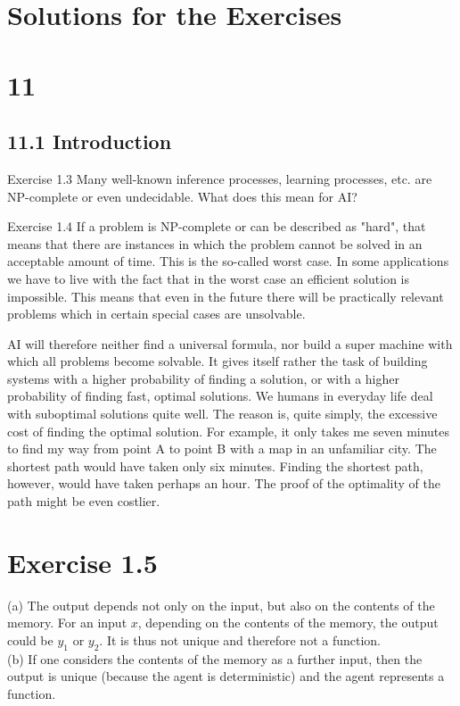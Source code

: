 \documentclass[10pt]{article}
\begin{document}
\section*{Solutions for the Exercises}
\section*{11}
\subsection*{11.1 Introduction}
Exercise 1.3 Many well-known inference processes, learning processes, etc. are NP-complete or even undecidable. What does this mean for AI?


Exercise 1.4 If a problem is NP-complete or can be described as "hard", that means that there are instances in which the problem cannot be solved in an acceptable amount of time. This is the so-called worst case. In some applications we have to live with the fact that in the worst case an efficient solution is impossible. This means that even in the future there will be practically relevant problems which in certain special cases are unsolvable.

AI will therefore neither find a universal formula, nor build a super machine with which all problems become solvable. It gives itself rather the task of building systems with a higher probability of finding a solution, or with a higher probability of finding fast, optimal solutions. We humans in everyday life deal with suboptimal solutions quite well. The reason is, quite simply, the excessive cost of finding the optimal solution. For example, it only takes me seven minutes to find my way from point A to point B with a map in an unfamiliar city. The shortest path would have taken only six minutes. Finding the shortest path, however, would have taken perhaps an hour. The proof of the optimality of the path might be even costlier.

\section*{Exercise 1.5}
(a) The output depends not only on the input, but also on the contents of the memory. For an input $x$, depending on the contents of the memory, the output could be $y_{1}$ or $y_{2}$. It is thus not unique and therefore not a function.\\
(b) If one considers the contents of the memory as a further input, then the output is unique (because the agent is deterministic) and the agent represents a function.
\end{document}
